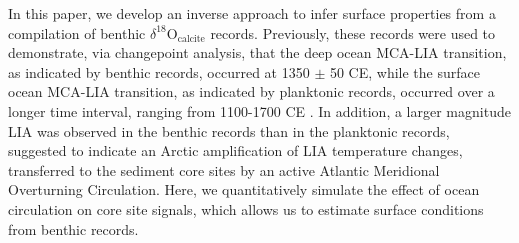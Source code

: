 \documentclass[draft]{agujournal2019}
\begin{document}

In this paper, we develop an inverse approach to infer surface properties from a compilation of benthic $\delta^{18}\mathrm{O}_{\mathrm{calcite}}$ records. Previously, these records were used to demonstrate, via changepoint analysis, that the deep ocean MCA-LIA transition, as indicated by benthic records, occurred at 1350 $\pm$ 50 CE, while the surface ocean MCA-LIA transition, as indicated by planktonic records, occurred over a longer time interval, ranging from 1100-1700 CE \cite[]{Lu-Oppo-2023:Surface}. In addition, a larger magnitude LIA was observed in the benthic records than in the planktonic records, suggested to indicate an Arctic amplification of LIA temperature changes, transferred to the sediment core sites by an active Atlantic Meridional Overturning Circulation. Here, we quantitatively simulate the effect of ocean circulation on core site signals, which allows us to estimate surface conditions from benthic records. 
\end{document}
